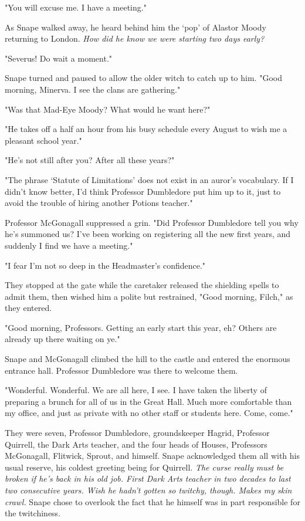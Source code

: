 \documentclass[a4paper,11pt]{article}
\begin{document}
"You will excuse me. I have a meeting."

As Snape walked away, he heard behind him the `pop' of Alastor Moody returning to London. \emph{How did he know we were starting two days early?}

"Severus! Do wait a moment."

Snape turned and paused to allow the older witch to catch up to him. "Good morning, Minerva. I see the clans are gathering."

"Was that Mad-Eye Moody? What would he want here?"

"He takes off a half an hour from his busy schedule every August to wish me a pleasant school year."

"He's not still after you? After all these years?"

"The phrase `Statute of Limitations' does not exist in an auror's vocabulary. If I didn't know better, I'd think Professor Dumbledore put him up to it, just to avoid the trouble of hiring another Potions teacher."

Professor McGonagall suppressed a grin. "Did Professor Dumbledore tell you why he's summoned us? I've been working on registering all the new first years, and suddenly I find we have a meeting."

"I fear I'm not so deep in the Headmaster's confidence."

They stopped at the gate while the caretaker released the shielding spells to admit them, then wished him a polite but restrained, "Good morning, Filch," as they entered.

"Good morning, Professors. Getting an early start this year, eh? Others are already up there waiting on ye."

Snape and McGonagall climbed the hill to the castle and entered the enormous entrance hall. Professor Dumbledore was there to welcome them.

"Wonderful. Wonderful. We are all here, I see. I have taken the liberty of preparing a brunch for all of us in the Great Hall. Much more comfortable than my office, and just as private with no other staff or students here. Come, come."

They were seven, Professor Dumbledore, groundskeeper Hagrid, Professor Quirrell, the Dark Arts teacher, and the four heads of Houses, Professors McGonagall, Flitwick, Sprout, and himself. Snape acknowledged them all with his usual reserve, his coldest greeting being for Quirrell. \emph{The curse really must be broken if he's back in his old job. First Dark Arts teacher in two decades to last two consecutive years. Wish he hadn't gotten so twitchy, though. Makes my skin crawl.} Snape chose to overlook the fact that he himself was in part responsible for the twitchiness.
\end{document}
